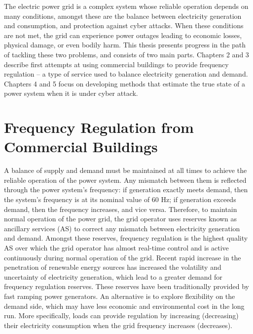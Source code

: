 \documentclass[../thesis.tex]{subfiles}
\begin{document}
The electric power grid is a complex system whose reliable operation depends on many conditions, amongst these are the balance between electricity generation and consumption, and protection against cyber attacks.
When these conditions are not met, the grid can experience power outages leading to economic losses, physical damage, or even bodily harm.
This thesis presents progress in the path of tackling these two problems, and consists of two main parts.
Chapters 2 and 3 describe first attempts at using commercial buildings to provide frequency regulation -- a type of service used to balance electricity generation and demand. 
Chapters 4 and 5 focus on developing methods that estimate the true state of a power system when it is under cyber attack.




\section{Frequency Regulation from Commercial Buildings}

A balance of supply and demand must be maintained at all times to achieve the reliable operation of the power system.
Any mismatch between them is reflected through the power system's frequency: if generation exactly meets demand, then the system's frequency is at its nominal value of 60 Hz; if generation exceeds demand, then the frequency increases, and vice versa.
Therefore, to maintain normal operation of the power grid, the grid operator uses reserves known as ancillary services (AS) to correct any mismatch between electricity generation and demand.
Amongst these reserves, frequency regulation is the highest quality AS over which the grid operator has almost real-time control and is active continuously during normal operation of the grid.
Recent rapid increase in the penetration of renewable energy sources has increased the volatility and uncertainty of electricity generation, which lead to a greater demand for frequency regulation reserves.
These reserves have been traditionally provided by fast ramping power generators.
An alternative is to explore flexibility on the demand side, which may have less economic and environmental cost in the long run. 
More specifically, loads can provide regulation by increasing (decreasing) their electricity consumption when the grid frequency increases (decreases).
\end{document}
